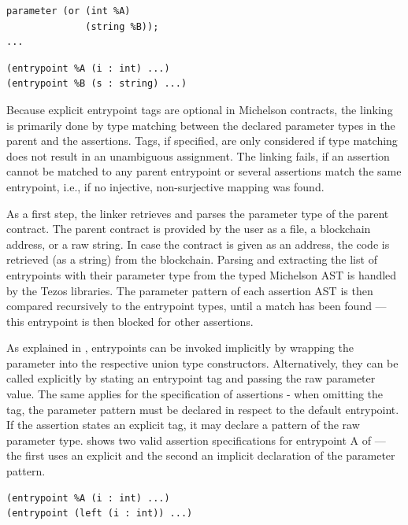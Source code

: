 \vspace{\baselineskip}
\noindent
\begin{minipage}{.45\textwidth}
\begin{lstlisting}[label=lst:linker_parent, numbers=none, language=Michelson, caption=Example.tz]
parameter (or (int %A)
              (string %B));
...
\end{lstlisting}
\end{minipage}\hfill
\begin{minipage}{.5\textwidth}
\begin{lstlisting}[label=lst:linker_assertion, numbers=none, language=Assertion, caption=Example.tza]
(entrypoint %A (i : int) ...)
(entrypoint %B (s : string) ...)
\end{lstlisting}
\end{minipage}
\vspace{\baselineskip}

Because explicit entrypoint tags are optional in Michelson contracts, the linking is primarily done by type matching between the declared parameter types in the parent and the assertions. Tags, if specified, are only considered if type matching does not result in an unambiguous assignment. The linking fails, if an assertion cannot be matched to any parent entrypoint or several assertions match the same entrypoint, i.e., if no injective, non-surjective mapping was found. 

As a first step, the linker retrieves and parses the parameter type of the parent contract. The parent contract is provided by the user as a file, a blockchain address, or a raw string. In case the contract is given as an address, the code is retrieved (as a string) from the blockchain. Parsing and extracting the list of entrypoints with their parameter type from the typed Michelson AST is handled by the Tezos libraries. The parameter pattern of each assertion AST is then compared recursively to the entrypoint types, until a match has been found --- this entrypoint is then blocked for other assertions.

As explained in , entrypoints can be invoked implicitly by wrapping the parameter into the respective union type constructors. Alternatively, they can be called explicitly by stating an entrypoint tag and passing the raw parameter value. The same applies for the specification of assertions - when omitting the tag, the parameter pattern must be declared in respect to the default entrypoint. If the assertion states an explicit tag, it may declare a pattern of the raw parameter type.  shows two valid assertion specifications for entrypoint A of  --- the first uses an explicit and the second an implicit declaration of the parameter pattern. 
\begin{lstlisting}[language=Assertion, numbers=none, caption=Explicit and implicit assertion specification, label=lst:impl_expl]
(entrypoint %A (i : int) ...)
(entrypoint (left (i : int)) ...)
\end{lstlisting}

